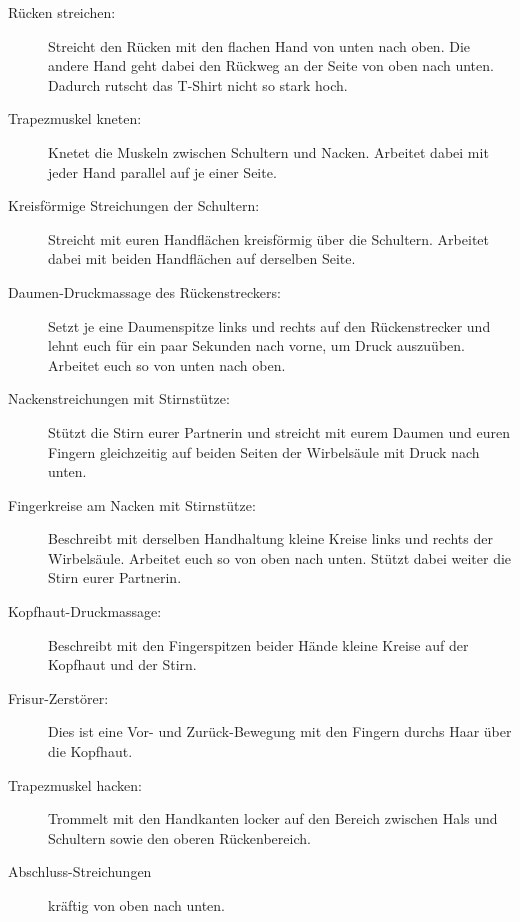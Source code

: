 \begin{description}
  \item [Rücken streichen:] Streicht den Rücken mit den flachen Hand von unten nach oben. Die andere Hand geht dabei den Rückweg an der Seite von oben nach unten. Dadurch rutscht das T-Shirt nicht so stark hoch.
  \item [Trapezmuskel kneten:] Knetet die Muskeln zwischen Schultern und Nacken. Arbeitet dabei mit jeder Hand parallel auf je einer Seite.
  \item [Kreisförmige Streichungen der Schultern:] Streicht mit euren Handflächen kreisförmig über die Schultern. Arbeitet dabei mit beiden Handflächen auf derselben Seite.
  \item [Daumen-Druckmassage des Rückenstreckers:] Setzt je eine Daumenspitze links und rechts auf den Rückenstrecker und lehnt euch für ein paar Sekunden nach vorne, um Druck auszuüben. Arbeitet euch so von unten nach oben.
  \item [Nackenstreichungen mit Stirnstütze:] Stützt die Stirn eurer Partnerin und streicht mit eurem Daumen und euren Fingern gleichzeitig auf beiden Seiten der Wirbelsäule mit Druck nach unten.
  \item [Fingerkreise am Nacken mit Stirnstütze:] Beschreibt mit derselben Handhaltung kleine Kreise links und rechts der Wirbelsäule. Arbeitet euch so von oben nach unten. Stützt dabei weiter die Stirn eurer Partnerin.
  \item [Kopfhaut-Druckmassage:] Beschreibt mit den Fingerspitzen beider Hände kleine Kreise auf der Kopfhaut und der Stirn.
  \item [Frisur-Zerstörer:] Dies ist eine Vor- und Zurück-Bewegung mit den Fingern durchs Haar über die Kopfhaut.
  \item [Trapezmuskel hacken:] Trommelt mit den Handkanten locker auf den Bereich zwischen Hals und Schultern sowie den oberen Rückenbereich.
  \item [Abschluss-Streichungen] kräftig von oben nach unten.
\end{description}
